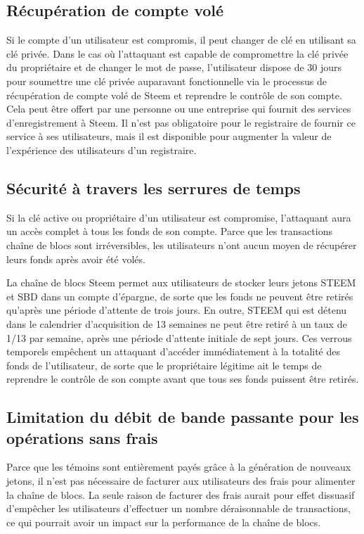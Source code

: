 \documentclass[11pt]{article}
\begin{document}
\subsection{Récupération de compte volé}
\label{sec:orgf7a2156}
Si le compte d'un utilisateur est compromis, il peut changer de clé
en utilisant sa clé privée. Dans le cas où l'attaquant est capable
de compromettre la clé privée du propriétaire et de changer le mot
de passe, l'utilisateur dispose de 30 jours pour soumettre une clé
privée auparavant fonctionnelle via le processus de récupération de
compte volé de Steem et reprendre le contrôle de son compte. Cela
peut être offert par une personne ou une entreprise qui fournit des
services d'enregistrement à Steem. Il n'est pas obligatoire pour le
registraire de fournir ce service à ses utilisateurs, mais il est
disponible pour augmenter la valeur de l'expérience des
utilisateurs d'un registraire.
\subsection{Sécurité à travers les serrures de temps}
\label{sec:org6319cc4}
Si la clé active ou propriétaire d'un utilisateur est compromise,
l'attaquant aura un accès complet à tous les fonds de son
compte. Parce que les transactions chaîne de blocs sont irréversibles,
les utilisateurs n'ont aucun moyen de récupérer leurs fonds après
avoir été volés. 

La chaîne de blocs Steem permet aux utilisateurs de stocker leurs jetons
STEEM et SBD dans un compte d'épargne, de sorte que les fonds ne
peuvent être retirés qu'après une période d'attente de trois
jours. En outre, STEEM qui est détenu dans le calendrier
d'acquisition de 13 semaines ne peut être retiré à un taux de 1/13
par semaine, après une période d'attente initiale de sept
jours. Ces verrous temporels empêchent un attaquant d'accéder
immédiatement à la totalité des fonds de l'utilisateur, de sorte
que le propriétaire légitime ait le temps de reprendre le contrôle
de son compte avant que tous ses fonds puissent être retirés.
\subsection{Limitation du débit de bande passante pour les opérations sans frais}
\label{sec:org909016a}
Parce que les témoins sont entièrement payés grâce à la génération
de nouveaux jetons, il n'est pas nécessaire de facturer aux
utilisateurs des frais pour alimenter la chaîne de blocs. La seule
raison de facturer des frais aurait pour effet dissuasif d'empêcher
les utilisateurs d'effectuer un nombre déraisonnable de
transactions, ce qui pourrait avoir un impact sur la performance de
la chaîne de blocs.
\end{document}
